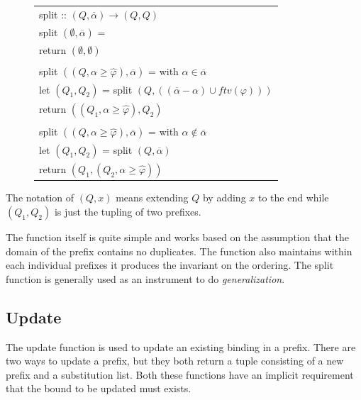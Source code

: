 \documentclass[twoside, titlepage, openright, a4paper]{book}
\renewcommand{\geq}{\geqslant}
\begin{document}
\begin{figure}[H]
\begin{tabular}[t]{l}
split :: $(Q, \overline{\alpha}) \rightarrow (Q,Q)$\\
split $(\emptyset, \overline{\alpha})$ = \\
\hspace{15pt} return $(\emptyset, \emptyset)$ \\
\\
split $((Q,\alpha \geq \hat{\varphi}),\overline{\alpha})$ = \hspace{15pt} with \hspace{5pt} $\alpha \in \overline{\alpha}$ \\
\hspace{15pt} let $(Q_1, Q_2)$ = split $(Q,((\overline{\alpha} - \alpha)\cup ftv(\varphi)))$ \\
\hspace{15pt} return $((Q_1, \alpha \geq \hat{\varphi}), Q_2)$ \\
\\
split $((Q,\alpha \geq \hat{\varphi}),\overline{\alpha})$ = \hspace{15pt} with \hspace{5pt} $\alpha \notin \overline{\alpha}$ \\
\hspace{15pt} let $(Q_1, Q_2)$ = split $(Q,\overline{\alpha})$ \\
\hspace{15pt} return $(Q_1, (Q_2, \alpha \geq \hat{\varphi}))$ \\
\end{tabular}
\end{figure}
The notation of $(Q,x)$ means extending $Q$ by adding $x$ to the end while $(Q_1, Q_2)$ is just the tupling of two prefixes.

The function itself is quite simple and works based on the assumption that the domain of the prefix contains no duplicates. The function also maintains within each individual prefixes it produces the invariant on the ordering. The split function is generally used as an instrument to do \emph{generalization}.
\subsection{Update}
The update function is used to update an existing binding in a prefix. There are two ways to update a prefix, but they both return a tuple consisting of a new prefix and a substitution list. Both these functions have an implicit requirement that the bound to be updated must exists.
\end{document}
